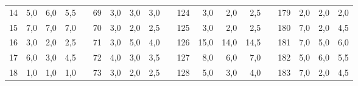 \begin{table}[H]
{\begin{tabular}{|c|r|r|r|l|c|r|r|r|l|c|r|r|r|lcrrr}
14                                                    & 5,0                                                                       & 6,0                                                                       & 5,5                                                                       &  & 69  & 3,0  & 3,0  & 3,0  &  & 124 & 3,0  & 2,0  & 2,5  & \multicolumn{1}{l|}{} & \multicolumn{1}{c|}{179} & \multicolumn{1}{r|}{2,0}  & \multicolumn{1}{r|}{2,0}  & \multicolumn{1}{r|}{2,0}  \\ \cline{1-4} \cline{6-9} \cline{11-14} \cline{16-19} 
15                                                    & 7,0                                                                       & 7,0                                                                       & 7,0                                                                       &  & 70  & 3,0  & 2,0  & 2,5  &  & 125 & 3,0  & 2,0  & 2,5  & \multicolumn{1}{l|}{} & \multicolumn{1}{c|}{180} & \multicolumn{1}{r|}{7,0}  & \multicolumn{1}{r|}{2,0}  & \multicolumn{1}{r|}{4,5}  \\ \cline{1-4} \cline{6-9} \cline{11-14} \cline{16-19} 
16                                                    & 3,0                                                                       & 2,0                                                                       & 2,5                                                                       &  & 71  & 3,0  & 5,0  & 4,0  &  & 126 & 15,0 & 14,0 & 14,5 & \multicolumn{1}{l|}{} & \multicolumn{1}{c|}{181} & \multicolumn{1}{r|}{7,0}  & \multicolumn{1}{r|}{5,0}  & \multicolumn{1}{r|}{6,0}  \\ \cline{1-4} \cline{6-9} \cline{11-14} \cline{16-19} 
17                                                    & 6,0                                                                       & 3,0                                                                       & 4,5                                                                       &  & 72  & 4,0  & 3,0  & 3,5  &  & 127 & 8,0  & 6,0  & 7,0  & \multicolumn{1}{l|}{} & \multicolumn{1}{c|}{182} & \multicolumn{1}{r|}{5,0}  & \multicolumn{1}{r|}{6,0}  & \multicolumn{1}{r|}{5,5}  \\ \cline{1-4} \cline{6-9} \cline{11-14} \cline{16-19} 
18                                                    & 1,0                                                                       & 1,0                                                                       & 1,0                                                                       &  & 73  & 3,0  & 2,0  & 2,5  &  & 128 & 5,0  & 3,0  & 4,0  & \multicolumn{1}{l|}{} & \multicolumn{1}{c|}{183} & \multicolumn{1}{r|}{7,0}  & \multicolumn{1}{r|}{2,0}  & \multicolumn{1}{r|}{4,5}  \\ \cline{1-4} \cline{6-9} \cline{11-14} \cline{16-19} 

\end{tabular}}
\end{table}
